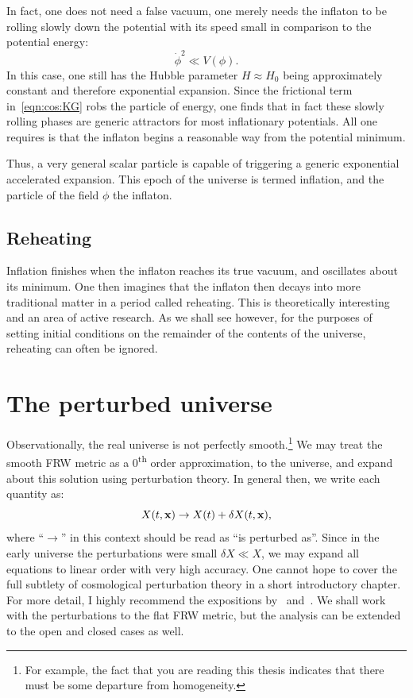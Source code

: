 In fact, one does not need a false vacuum, one merely needs the inflaton to be rolling slowly down the potential with its speed small in comparison to the potential energy:
\begin{equation}
  \dot{\phi}^2 \ll V(\phi).
  \label{eqn:cos:slow_roll}
\end{equation}
In this case, one still has the Hubble parameter \(H\approx H_0\) being approximately constant and therefore exponential expansion. Since the frictional term in~\eqref{eqn:cos:KG} robs the particle of energy, one finds that in fact these slowly rolling phases are generic attractors for most inflationary potentials. All one requires is that the inflaton begins a reasonable way from the potential minimum.

Thus, a very general scalar particle is capable of triggering a generic exponential accelerated expansion. This epoch of the universe is termed inflation, and the particle of the field \(\phi\) the inflaton.

\subsection{Reheating}
Inflation finishes when the inflaton reaches its true vacuum, and oscillates about its minimum. One then imagines that the inflaton then decays into more traditional matter in a period called reheating. This is theoretically interesting and an area of active research. As we shall see however, for the purposes of setting initial conditions on the remainder of the contents of the universe, reheating can often be ignored.




\section{The perturbed universe}
Observationally, the real universe is not perfectly smooth.\footnote{For example, the fact that you are reading this thesis indicates that there must be some departure from homogeneity.}
We may treat the smooth FRW metric as a 0\textsuperscript{th} order approximation, to the universe, and expand about this solution using perturbation theory. In general then, we write each quantity as:
\begin{equation}
  X(t,\mathbf{x}) \rightarrow X(t) + \delta X(t,\mathbf{x}),
  \label{eqn:cos:expansion}
\end{equation}
where ``\(\rightarrow\)'' in this context should be read as ``is perturbed as''.
Since in the early universe the perturbations were small \(\delta X \ll X\), we may expand all equations to linear order with very high accuracy. One cannot hope to cover the full subtlety of cosmological perturbation theory in a short introductory chapter. For more detail, I highly recommend the expositions by~\cite{mukhanov_theory_1992} and~\cite{Baumann+2009}. We shall work with the perturbations to the flat FRW metric, but the analysis can be extended to the open and closed cases as well.



